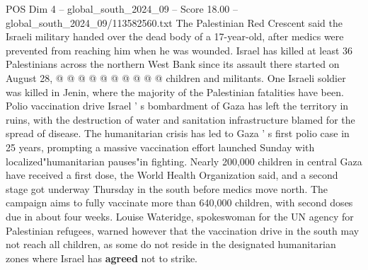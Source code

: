 \begin{textsample}{POS Dim 4 – global\_south\_2024\_09 – Score 18.00 – global\_south\_2024\_09/113582560.txt}
The Palestinian Red Crescent said the Israeli military handed over the dead body of a 17-year-old, after medics were prevented from reaching him when he was wounded.
Israel has killed at least 36 Palestinians across the northern West Bank since its assault there started on August 28, @ @ @ @ @ @ @ @ @ @ children and militants.
One Israeli soldier was killed in Jenin, where the majority of the Palestinian fatalities have been.
Polio vaccination drive Israel ' s bombardment of Gaza has left the territory in ruins, with the destruction of water and sanitation infrastructure blamed for the spread of disease.
The humanitarian crisis has led to Gaza ' s first polio case in 25 years, prompting a massive vaccination effort launched Sunday with localized"humanitarian pauses"in fighting.
Nearly 200,000 children in central Gaza have received a first dose, the World Health Organization said, and a second stage got underway Thursday in the south before medics move north.
The campaign aims to fully vaccinate more than 640,000 children, with second doses due in about four weeks.
Louise Wateridge, spokeswoman for the UN agency for Palestinian refugees, warned however that the vaccination drive in the south may not reach all children, as some do not reside in the designated humanitarian zones where Israel has \textbf{agreed} not to strike.

\end{textsample}

